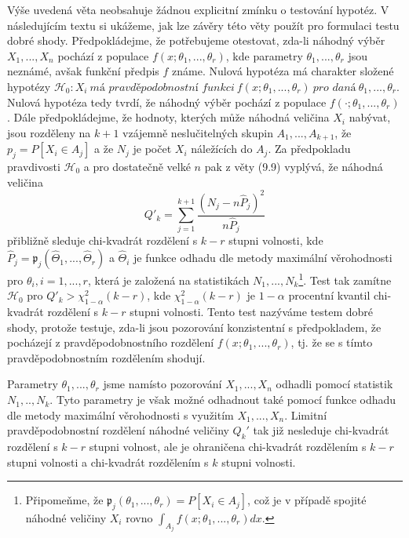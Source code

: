 Výše uvedená věta neobsahuje žádnou explicitní zmínku o testování hypotéz. V následujícím textu si ukážeme, jak lze závěry této věty použít pro formulaci testu dobré shody. Předpokládejme, že potřebujeme otestovat, zda-li náhodný výběr $X_1, ..., X_n$ pochází z populace $f(x; \theta_1, ..., \theta_r)$, kde parametry $\theta_1, ..., \theta_r$ jsou neznámé, avšak funkční předpis $f$ známe. Nulová hypotéza má charakter složené hypotézy $\mathscr{H}_0: X_i ~ \textit{má pravděpodobnostní funkci} ~ f(x; \theta_1, ..., \theta_r) ~ \textit{pro daná} ~ \theta_1, ..., \theta_r$. Nulová hypotéza tedy tvrdí, že náhodný výběr pochází z populace $f(\cdot; \theta_1, ..., \theta_r)$. Dále předpokládejme, že hodnoty, kterých může náhodná veličina $X_i$ nabývat, jsou rozděleny na $k + 1$ vzájemně neslučitelných skupin $A_1, ..., A_{k + 1}$, že $p_j = P[X_i \in A_j]$ a že $N_j$ je počet $X_i$ náležících do $A_j$. Za předpokladu pravdivosti $\mathscr{H}_0$ a pro dostatečně velké $n$ pak z věty (9.9) vyplývá, že náhodná veličina 
\begin{equation*}
Q'_k = \sum_{j = 1}^{k + 1} \frac{(N_j - n \hat{P}_j)^2}{n \hat{P}_j}
\end{equation*}
přibližně sleduje chi-kvadrát rozdělení s $k - r$ stupni volnosti, kde $\hat{P}_j = \mathfrak{p}_j(\hat{\Theta}_1, ..., \hat{\Theta}_r)$ a $\hat{\Theta}_i$ je funkce odhadu dle metody maximální věrohodnosti pro $\theta_i, i = 1, ..., r$, která je založená na statistikách $N_1, ..., N_k$\footnote{Připomeňme, že $\mathfrak{p}_j(\theta_1, ..., \theta_r) = P[X_i \in A_j]$, což je v případě spojité náhodné veličiny $X_i$ rovno $\int_{A_j}f(x; \theta_1, ..., \theta_r)dx$.}. Test tak zamítne $\mathscr{H}_0$ pro $Q'_k > \chi^2_{1 - \alpha}(k - r)$, kde $\chi^2_{1 - \alpha}(k - r)$ je $1 - \alpha$ procentní kvantil chi-kvadrát rozdělení s $k - r$ stupni volnosti. Tento test nazýváme testem dobré shody, protože testuje, zda-li jsou pozorování konzistentní s předpokladem, že pocházejí z pravděpodobnostního rozdělení $f(x; \theta_1, ..., \theta_r)$, tj. že se s tímto pravděpodobnostním rozdělením shodují.

Parametry $\theta_1, ..., \theta_r$ jsme namísto pozorování $X_1, ..., X_n$ odhadli pomocí statistik $N_1, .., N_k$. Tyto parametry je však možné odhadnout také pomocí funkce odhadu dle metody maximální věrohodnosti s využitím $X_1, ..., X_n$. Limitní pravděpodobnostní rozdělení náhodné veličiny $Q_k'$ tak již nesleduje chi-kvadrát rozdělení s $k - r$ stupni volnost, ale je ohraničena chi-kvadrát rozdělením s $k - r$ stupni volnosti a chi-kvadrát rozdělením s $k$ stupni volnosti.

